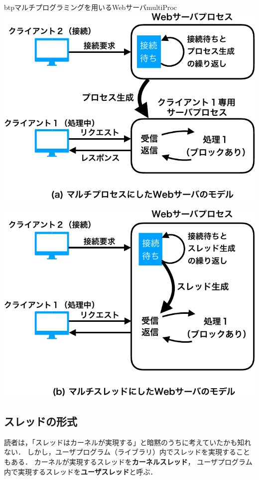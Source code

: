 \begin{myfig}{btp}{マルチプログラミングを用いるWebサーバ}{multiProc}
\includegraphics[scale=0.6]{Fig/multiProc-crop.pdf}

\vspace{0.8cm}

\includegraphics[scale=0.6]{Fig/multiThread-crop.pdf}
\end{myfig}

\subsection{スレッドの形式}
読者は，「スレッドはカーネルが実現する」と暗黙のうちに考えていたかも知れない．
しかし，ユーザプログラム（ライブラリ）内でスレッドを実現することもある．
カーネルが実現するスレッドを{\bf カーネルスレッド}，
ユーザプログラム内で実現するスレッドを{\bf ユーザスレッド}と呼ぶ．

